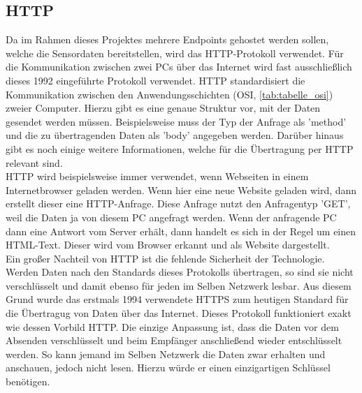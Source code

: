 \subsection{HTTP}
Da im Rahmen dieses Projektes mehrere Endpoints gehostet werden sollen, welche die Sensordaten bereitstellen, wird das \ac{HTTP}-Protokoll verwendet. Für die Kommunikation zwischen zwei PCs über das Internet wird fast ausschließlich dieses 1992 eingeführte Protokoll verwendet. \ac{HTTP}  standardisiert die Kommunikation zwischen den Anwendungsschichten (\ac{OSI}, \autoref{tab:tabelle_osi}) zweier Computer. Hierzu gibt es eine genaue Struktur vor, mit der Daten gesendet werden müssen. Beispielsweise muss der Typ der Anfrage als 'method' und die zu übertragenden Daten als 'body' angegeben werden. Darüber hinaus gibt es noch einige weitere Informationen, welche für die Übertragung per HTTP relevant sind.\\
\ac{HTTP} wird beispielsweise immer verwendet, wenn Webseiten in einem Internetbrowser geladen werden. Wenn hier eine neue Website geladen wird, dann erstellt dieser eine HTTP-Anfrage. Diese Anfrage nutzt den Anfragentyp 'GET', weil die Daten ja von diesem PC angefragt werden. Wenn der anfragende PC dann eine Antwort vom Server erhält, dann handelt es sich in der Regel um einen \ac{HTML}-Text. Dieser wird vom Browser erkannt und als Website dargestellt.\\
Ein großer Nachteil von \ac{HTTP} ist die fehlende Sicherheit der Technologie. Werden Daten nach den Standards dieses Protokolls übertragen, so sind sie nicht verschlüsselt und damit ebenso für jeden im Selben Netzwerk lesbar. Aus diesem Grund wurde das erstmals 1994 verwendete \ac{HTTPS} zum heutigen Standard für die Übertragug von Daten über das Internet. Dieses Protokoll funktioniert exakt wie dessen Vorbild \ac{HTTP}. Die einzige Anpassung ist, dass die Daten vor dem Absenden verschlüsselt und beim Empfänger anschließend wieder entschlüsselt werden. So kann jemand im Selben Netzwerk die Daten zwar erhalten und anschauen, jedoch nicht lesen. Hierzu würde er einen einzigartigen Schlüssel benötigen.\\
